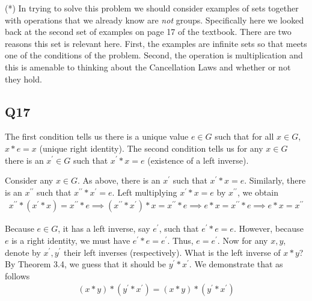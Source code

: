 \documentclass[12pt]{article}
\numberwithin{theorem}{section}
\numberwithin{equation}{section}
\numberwithin{remark}{section}
\numberwithin{definition}{section}
\numberwithin{theorem}{section}
\numberwithin{lemma}{section}
\numberwithin{example}{section}
\begin{document}
\vspace{\baselineskip}

\noindent (*) In trying to solve this problem we should consider examples of sets together with operations that we already know are \emph{not} groups. Specifically here we looked back at the second set of examples on page 17 of the textbook. There are two reasons this set is relevant here. First, the examples are infinite sets so that meets one of the conditions of the problem. Second, the operation is multiplication and this is amenable to thinking about the Cancellation Laws and whether or not they hold. 



\subsection{Q17}

The first condition tells us there is a unique value $e\in G$ such that for all $x\in G$, $x*e=x$ (unique right identity). The second condition tells us for any $x\in G$ there is an $x^\prime\in G$ such that $x^\prime * x = e$ (existence of a left inverse). 

Consider any $x\in G$. As above, there is an $x^\prime$ such that $x^\prime * x = e$. Similarly, there is an $x^{\prime\prime}$ such that $x^{\prime\prime}*x^\prime=e$. Left multiplying $x^\prime * x = e$ by $x^{\prime\prime}$, we obtain
\begin{align*}
	x^{\prime\prime}*(x^\prime* x) = x^{\prime\prime} * e \implies (x^{\prime\prime}*x^\prime)* x = x^{\prime\prime} * e \implies e * x = x^{\prime\prime} * e \implies e * x = x^{\prime\prime}
\end{align*}


Because $e\in G$, it has a left inverse, say $e^\prime$, such that $e^\prime * e = e$. However, because $e$ is a right identity, we must have $e^\prime*e=e^\prime$. Thus, $e=e^\prime$. Now for any $x,y$, denote by $x^\prime,y^\prime$ their left inverses (respectively). What is the left inverse of $x*y$? By Theorem 3.4, we guess that it should be $y^\prime * x^\prime$. We demonstrate that as follows
\begin{align*}
	(x*y)*(y^\prime * x^\prime)=(x*y)*(y^\prime * x^\prime)
\end{align*}
\end{document}
